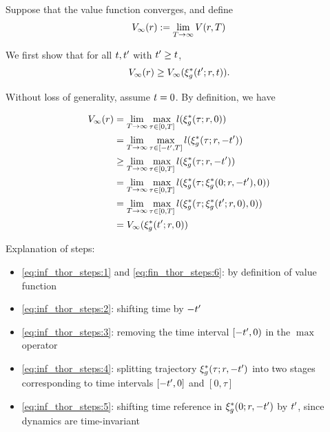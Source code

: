 \begin{IEEEproof}
  
  Suppose that the value function converges, and define
  \begin{equation}
  \label{eq:conv_valfunc}
  \valfunc_\infty(\rstate) := \lim_{\thor\rightarrow\infty}\valfunc(\rstate, T)
  \end{equation}
  
  We first show that for all $t, t'$ with $t' \ge t$,
  \begin{equation}
  \label{eq:invariant}
  \valfunc_\infty(\rstate) \ge \valfunc_\infty(\rtraj^*(\tvar'; \rstate, \tvar)).
  \end{equation}
  
Without loss of generality, assume $t=0$. By definition, we have

\begin{subequations} \label{eq:inf_thor_steps}
  \begin{align}
  \valfunc_\infty(\rstate) & = \lim_{\thor\rightarrow\infty}\max_{\tau \in [0, \thor]} \errfunc(\rtraj^*(\tau; \rstate, 0)) \label{eq:inf_thor_steps:1}\\
  &= \lim_{\thor\rightarrow\infty}\max_{\tau \in [-\tvar', \thor]} \errfunc(\rtraj^*(\tau; \rstate, -\tvar')) \label{eq:inf_thor_steps:2}\\
  &\ge \lim_{\thor\rightarrow\infty}\max_{\tau \in [0, \thor]} \errfunc(\rtraj^*(\tau; \rstate, -\tvar')) \label{eq:inf_thor_steps:3}\\
  & = \lim_{\thor\rightarrow\infty}\max_{\tau \in [0, \thor]} \errfunc(\rtraj^*(\tau; \rtraj^*(0; \rstate, -\tvar'), 0)) \label{eq:inf_thor_steps:4}\\
  & = \lim_{\thor\rightarrow\infty}\max_{\tau \in [0, \thor]} \errfunc(\rtraj^*(\tau; \rtraj^*(\tvar'; \rstate, 0), 0)) \label{eq:inf_thor_steps:5}\\
  & = \valfunc_\infty(\rtraj^*(\tvar'; \rstate, 0)) \label{eq:inf_thor_steps:6}
  \end{align}
\end{subequations}

Explanation of steps:
\begin{itemize}
  \item \eqref{eq:inf_thor_steps:1} and \eqref{eq:fin_thor_steps:6}: by definition of value function
  \item \eqref{eq:inf_thor_steps:2}: shifting time by $-t'$
  \item \eqref{eq:inf_thor_steps:3}: removing the time interval $[-t',0)$ in the $\max$ operator
  \item \eqref{eq:inf_thor_steps:4}: splitting trajectory $\xi_g^*(\tau; r, -t')$ into two stages corresponding to time intervals $[-t', 0]$ and $[0, \tau]$
  \item \eqref{eq:inf_thor_steps:5}: shifting time reference in $\xi_g^*(0; r, -t')$ by $t'$, since dynamics are time-invariant
\end{itemize}


\end{IEEEproof}
